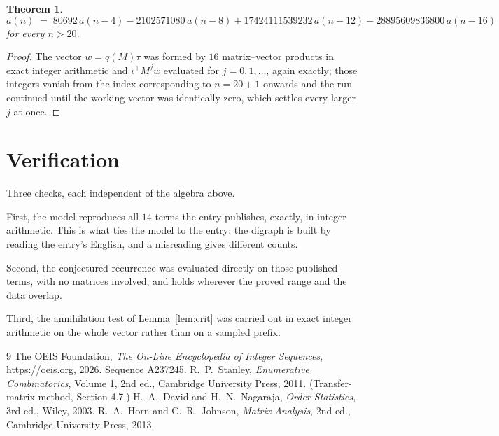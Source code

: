 \documentclass[11pt,a4paper]{article}
\theoremstyle{plain}
\newtheorem{theorem}{Theorem}
\theoremstyle{definition}
\begin{document}
\begin{theorem}
\[
a(n)\;=\;80692\,a(n-4) - 2102571080\,a(n-8) + 17424111539232\,a(n-12) - 28895609836800\,a(n-16)
\]
for every $n>20$.
\end{theorem}

\begin{proof}
The vector $w=q(M)\tau$ was formed by $16$ matrix--vector products in exact integer
arithmetic and $\iota^{\!\top}M^{j}w$ evaluated for $j=0,1,\dots$, again exactly; those
integers vanish from the index corresponding to $n=20+1$ onwards and the run continued
until the working vector was identically zero, which settles every larger $j$ at once.
\end{proof}

\section{Verification}

Three checks, each independent of the algebra above.

First, the model reproduces all $14$ terms the entry publishes, exactly, in integer
arithmetic. This is what ties the model to the entry: the digraph is built by reading the
entry's English, and a misreading gives different counts.

Second, the conjectured recurrence was evaluated directly on those published terms, with no
matrices involved, and holds wherever the proved range and the data overlap.

Third, the annihilation test of Lemma~\ref{lem:crit} was carried out in exact integer
arithmetic on the whole vector rather than on a sampled prefix.

\begin{thebibliography}{9}
 The OEIS Foundation, \emph{The On-Line Encyclopedia of Integer
Sequences}, \url{https://oeis.org}, 2026. Sequence A237245.
 R.~P.~Stanley, \emph{Enumerative Combinatorics}, Volume 1, 2nd ed.,
Cambridge University Press, 2011. (Transfer-matrix method, Section 4.7.)
 H.~A.~David and H.~N.~Nagaraja, \emph{Order Statistics}, 3rd ed., Wiley,
2003.
 R.~A.~Horn and C.~R.~Johnson, \emph{Matrix Analysis}, 2nd ed., Cambridge
University Press, 2013.
\end{thebibliography}
\end{document}
